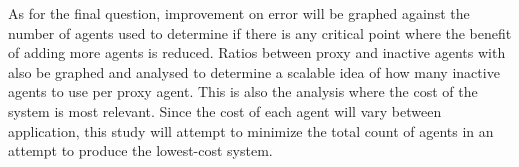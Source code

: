 As for the final question, improvement on error will be graphed against the number of
agents used to determine if there is any critical point where the benefit of adding
more agents is reduced.
Ratios between proxy and inactive agents with also be graphed and analysed to
determine a scalable idea of how many inactive agents to use per proxy agent.
This is also the analysis where the cost of the system is most relevant.
Since the cost of each agent will vary between application, this study will attempt to
minimize the total count of agents in an attempt to produce the lowest-cost system.
